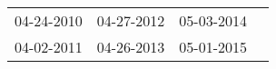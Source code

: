 \begin{supertabular}{llll}
 04-24-2010 &  04-27-2012 &  05-03-2014 \\
 04-02-2011 &  04-26-2013 &  05-01-2015 \\
\end{supertabular}
